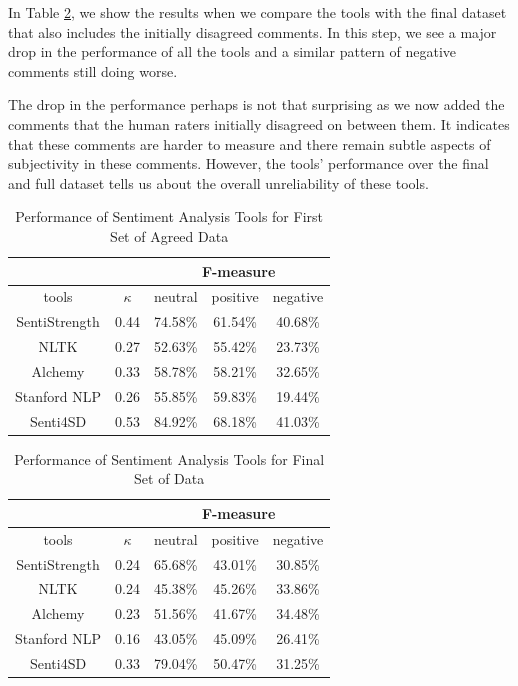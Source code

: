 In Table \ref{sentfinal}, we show the results when we compare the tools with the final dataset that also includes the initially disagreed comments. In this step, we see a major drop in the performance of all the tools and a similar pattern of negative comments still doing worse.

The drop in the performance perhaps is not that surprising as we now added the comments that the human raters initially disagreed on between them. It indicates that these comments are harder to measure and there remain subtle aspects of subjectivity in these comments. However, the tools' performance over the final and full dataset tells us about the overall unreliability of these tools.


\vspace{3mm}
\noindent{}

\begin{table}
\centering
\caption{Performance of Sentiment Analysis Tools for First Set of  Agreed Data}
\label{sentfirst}
\begin{tabular}{|c|c|c|c|c|}
\hline
\multicolumn{2}{|c|}{ } & \multicolumn{3}{c|}{ F-measure } \\
\hline
tools & $\kappa$ & neutral & positive & negative \\
\hline
SentiStrength & 0.44 & 74.58\% & 61.54\% & 40.68\% \\
\hline
NLTK & 0.27 & 52.63\% & 55.42\% & 23.73\% \\
\hline
Alchemy & 0.33 & 58.78\% & 58.21\% & 32.65\% \\
\hline
Stanford NLP & 0.26 & 55.85\% & 59.83\% & 19.44\% \\
\hline
Senti4SD & 0.53 & 84.92\% & 68.18\% & 41.03\% \\
\hline
\end{tabular}
\end{table}

\begin{table}
\centering
\caption{Performance of Sentiment Analysis Tools for Final Set of Data}
\label{sentfinal}
\begin{tabular}{|c|c|c|c|c|}
\hline
\multicolumn{2}{|c|}{ } & \multicolumn{3}{c|}{ F-measure } \\
\hline
tools & $\kappa$ & neutral & positive & negative \\
\hline
SentiStrength & 0.24 & 65.68\% & 43.01\% & 30.85\% \\
\hline
NLTK & 0.24 & 45.38\% & 45.26\% & 33.86\% \\
\hline
Alchemy & 0.23 & 51.56\% & 41.67\% & 34.48\% \\
\hline
Stanford NLP & 0.16 & 43.05\% & 45.09\% & 26.41\% \\
\hline
Senti4SD & 0.33 & 79.04\% & 50.47\% &  31.25\% \\
\hline
\end{tabular}
\end{table}

